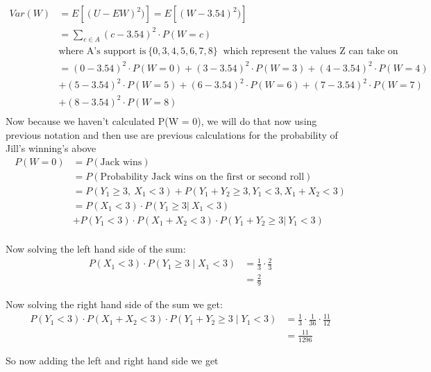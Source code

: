 \documentclass{article}
\numberwithin{equation}{section}
\newcommand{\Z}{&=}
\newcommand{\eqname}[1]{\tag*{#1}}%
\begin{document}
\begin{align}
    \label{Var(W)}
        Var(W) &= E\left[ (U-EW)^2) \right] = E\left[ (W-3.54)^2) \right] \eqname{} \\
        &= \sum_{c \in A} {(c-3.54)^2 \cdot P(W=c)} \eqname{} \\
        & \text{where A's support is} \:\{0,3,4,5,6,7,8\} \:\text{ which represent the values Z can take on} \eqname{} \\
        &= (0-3.54)^2 \cdot P(W=0)+ (3-3.54)^2  \cdot P(W=3)+ (4-3.54)^2 \cdot P(W=4) \eqname{} \\
        & + (5-3.54)^2 \cdot P(W=5) + (6-3.54)^2\cdot P(W=6) + (7-3.54)^2 \cdot P(W=7) \eqname{} \\
        & + (8-3.54)^2 \cdot P(W=8) \eqname{} \\
\end{align}
Now because we haven't calculated P(W = 0), we will do that now using previous notation and then use are previous calculations for the probability of Jill's winning's above
\begin{align}
        P(W=0) &= P(\text{Jack wins})\eqname{} \\
        &= P(\text{Probability Jack wins on the first or second roll})\eqname{} \\
        &= P(Y_1 \geq 3, \: X_1 < 3) + P(Y_1+Y_2 \geq 3, Y_1 < 3, X_1+X_2 <3)\eqname{} \\
        &= P(X_1 < 3) \cdot P(Y_1 \geq 3 \vert \: X_1 < 3) \: \eqname{} \\&+P(Y_1 < 3) \cdot P(X_1+X_2 < 3) \cdot   P(Y_1+Y_2 \geq 3 \vert \: Y_1 < 3) \eqname{} \\
\end{align}

Now solving the left hand side of the sum:
\begin{align}
        P(X_1 < 3) \cdot P(Y_1 \geq 3 \mid X_1 < 3) &= \frac{1}{3}\cdot \frac{2}{3} \eqname{} \\
        \Z \frac{2}{9} 
\end{align}

Now solving the right hand side of the sum we get:
\begin{align}
        P(Y_1 < 3) \cdot P(X_1+X_2 < 3) \cdot P(Y_1+Y_2 \geq 3 \mid Y_1 < 3) &= \frac{1}{3}\cdot \frac{1}{36}\cdot \frac{11}{12} \eqname{} \\ 
        &= \frac{11}{1296}
\end{align}

So now adding the left and right hand side we get
\end{document}
